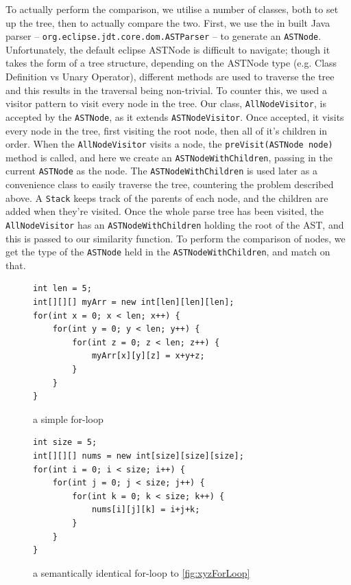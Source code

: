 To actually perform 
the comparison, we utilise a number of classes, both to set up the tree, then to actually
compare the two. First, we use the in built Java parser -- \texttt{org.eclipse.jdt.core.dom.ASTParser}
-- to generate an \texttt{ASTNode}. Unfortunately, the default eclipse ASTNode is difficult
to navigate; though it takes the form of a tree structure, depending on the ASTNode 
type (e.g. Class Definition vs Unary Operator), different methods are used to traverse
the tree and this results in the traversal being non-trivial. To counter this, we
used a visitor pattern to visit every node in the tree. Our class, \texttt{AllNodeVisitor},
is accepted by the \texttt{ASTNode}, as it extends \texttt{ASTNodeVisitor}. Once accepted, it visits
every node in the tree, first visiting the root node, then all of it's children in 
order. When the \texttt{AllNodeVisitor} visits a node, the 
\texttt{preVisit(ASTNode node)} method is called, and here we
create an \texttt{ASTNodeWithChildren}, passing in the current \texttt{ASTNode} as the node. The 
\texttt{ASTNodeWithChildren} is used later as a convenience class to easily traverse
the tree, countering the problem described above. A \texttt{Stack} keeps track
of the parents of each node, and the children are added when they're visited.
Once the whole parse tree has been visited, the \texttt{AllNodeVisitor} has an 
\texttt{ASTNodeWithChildren} holding the root of the AST, and this is passed to
our similarity function.
To perform the comparison of nodes, we get the type of the \texttt{ASTNode} held
in the \texttt{ASTNodeWithChildren}, and match on that.

\begin{figure}
\begin{minipage}[b]{0.45\linewidth}
\begin{lstlisting}
int len = 5;
int[][][] myArr = new int[len][len][len];
for(int x = 0; x < len; x++) {
	for(int y = 0; y < len; y++) {
		for(int z = 0; z < len; z++) {
			myArr[x][y][z] = x+y+z;
		}
	}
}
\end{lstlisting}
\caption{a simple for-loop}
\label{fig:xyzForLoop}
\end{minipage}
\hspace{0.5cm}
\begin{minipage}[b]{0.45\linewidth}
\begin{lstlisting}
int size = 5;
int[][][] nums = new int[size][size][size];
for(int i = 0; i < size; i++) {
	for(int j = 0; j < size; j++) {
		for(int k = 0; k < size; k++) {
			nums[i][j][k] = i+j+k;
		}
	}
}
\end{lstlisting}
\caption{a semantically identical for-loop to \ref{fig:xyzForLoop}}
\label{fig:ijkForLoop}
\end{minipage}
\end{figure}

